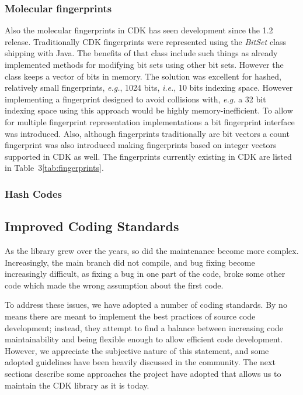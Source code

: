 \documentclass[10pt]{bmcart}
\begin{document}
\subsubsection*{Molecular fingerprints}
Also the molecular fingerprints in CDK has seen development since the 1.2
release. Traditionally CDK fingerprints were represented using the
\textit{BitSet} class shipping with Java. The benefits of that class include
such things as already implemented methods for modifying bit sets using other
bit sets. However the class keeps a vector of bits in memory. The solution was
excellent for hashed, relatively small fingerprints, \textit{e.g.}, 1024 bits,
\textit{i.e.}, 10 bits indexing space. However implementing a fingerprint
designed to avoid collisions with, \textit{e.g.} a 32 bit indexing space using
this approach would be highly memory-inefficient. To allow for multiple
fingerprint representation implementations a bit fingerprint interface was
introduced. Also, although fingerprints traditionally are bit vectors a count
fingerprint was also introduced making fingerprints based on integer vectors
supported in CDK as well. The fingerprints currently existing in CDK are listed
in Table~3\ref{tab:fingerprints}.

\subsubsection*{Hash Codes}


\subsection*{Improved Coding Standards}

As the library grew over the years, so did the maintenance become more complex. Increasingly,
the main branch did not compile, and bug fixing become increasingly difficult, as fixing a bug
in one part of the code, broke some other code which made the wrong assumption about the first
code.

To address these issues, we have adopted a number of coding standards. By no means there are
meant to implement the best practices of source code development; instead, they attempt to find
a balance between increasing code maintainability and being flexible enough to allow efficient
code development. However, we appreciate the subjective nature of this statement, and some
adopted guidelines have been heavily discussed in the community.
The next sections describe some approaches the project have adopted that allows us to
maintain the CDK library as it is today. 
\end{document}
